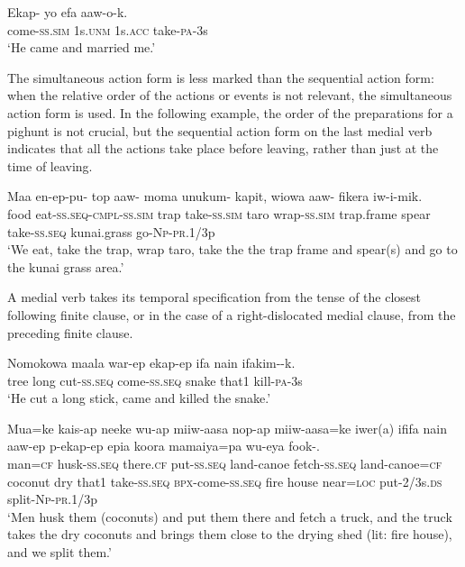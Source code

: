 \ea%
\label{ex:8:x1433}
\gll Ekap-  yo  efa  aaw-o-k. \\
come-\textsc{ss}.\textsc{sim} 1s.\textsc{unm} 1s.\textsc{acc} take-\textsc{pa}-3s\\
\glt`He came and married me.'
\z


The simultaneous action form is less marked than the sequential action form: when the relative order of the actions or events is not relevant, the simultaneous action form is used. In the following example, the order of the preparations for a pighunt is not crucial, but the sequential action form on the last medial verb indicates that all the actions take place before leaving, rather than just at the time of leaving.  

\ea%
\label{ex:8:x1437}
\gll Maa  en-ep-pu-  top  aaw-  moma unukum-  kapit,  wiowa  aaw-  fikera iw-i-mik.\\
food  eat-\textsc{ss}.\textsc{seq}-\textsc{cmpl}-\textsc{ss}.\textsc{sim} trap take-\textsc{ss}.\textsc{sim} taro wrap-\textsc{ss}.\textsc{sim} trap.frame spear take-\textsc{ss}.\textsc{seq} kunai.grass go-\textsc{Np}-\textsc{pr}.1/3p\\
\glt`We eat, take the trap, wrap taro, take the the trap frame and spear(s) and go to the kunai grass area.'
\z


A medial verb takes its temporal specification from the tense of the closest following finite clause, or in the case of a right-dislocated medial clause, from the preceding finite clause.

\ea%
\label{ex:8:x1442}
\gll Nomokowa  maala  war-ep    ekap-ep  ifa  nain  ifakim--k.\\
tree  long  cut-\textsc{ss}.\textsc{seq} come-\textsc{ss}.\textsc{seq} snake that1 kill-\textsc{pa}-3s\\
\glt`He cut a long stick, came and killed the snake.'
\z


\ea%
\label{ex:8:x1444}
\gll Mua=ke  kais-ap  neeke  wu-ap  miiw-aasa  nop-ap miiw-aasa=ke  iwer(a)  ififa  nain  aaw-ep  p-ekap-ep epia  koora  mamaiya=pa  wu-eya  fook-.\\
man=\textsc{cf} husk-\textsc{ss}.\textsc{seq} there.\textsc{cf} put-\textsc{ss}.\textsc{seq} land-canoe fetch-\textsc{ss}.\textsc{seq} land-canoe=\textsc{cf} coconut dry that1 take-\textsc{ss}.\textsc{seq} \textsc{\textsc{bp}x}-come-\textsc{ss}.\textsc{seq} fire house near=\textsc{loc} put-2/3s.\textsc{ds} split-\textsc{Np}-\textsc{pr}.1/3p\\
\glt`Men husk them (coconuts) and put them there and fetch a truck, and the truck takes the dry coconuts and brings them close to the drying shed (lit: fire house), and we split them.'
\z


